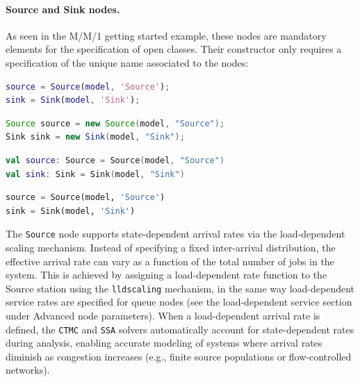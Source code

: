 \paragraph{Source and Sink nodes.} As seen in the M/M/1 getting started example, these nodes are mandatory elements for the specification of open classes. Their constructor only requires a specification of the unique name associated to the nodes:
\begin{MATLAB}
\begin{lstlisting}[language = matlab]
source = Source(model, 'Source');
sink = Sink(model, 'Sink');
\end{lstlisting}
\end{MATLAB}
\begin{JAVA}
\begin{lstlisting}[language = java, basicstyle=\ttfamily\scriptsize]
Source source = new Source(model, "Source");
Sink sink = new Sink(model, "Sink");
\end{lstlisting}
\end{JAVA}
\begin{KOTLIN}
\begin{lstlisting}[language = kotlin, basicstyle=\ttfamily\scriptsize]
val source: Source = Source(model, "Source")
val sink: Sink = Sink(model, "Sink")
\end{lstlisting}
\end{KOTLIN}
\begin{PYTHON}
\begin{lstlisting}[language = python]
source = Source(model, 'Source')
sink = Sink(model, 'Sink')
\end{lstlisting}
\end{PYTHON}

The \texttt{Source} node supports state-dependent arrival rates via the load-dependent scaling mechanism. Instead of specifying a fixed inter-arrival distribution, the effective arrival rate can vary as a function of the total number of jobs in the system. This is achieved by assigning a load-dependent rate function to the Source station using the \texttt{lldscaling} mechanism, in the same way load-dependent service rates are specified for queue nodes (see the load-dependent service section under Advanced node parameters). When a load-dependent arrival rate is defined, the \texttt{CTMC} and \texttt{SSA} solvers automatically account for state-dependent rates during analysis, enabling accurate modeling of systems where arrival rates diminish as congestion increases (e.g., finite source populations or flow-controlled networks).

